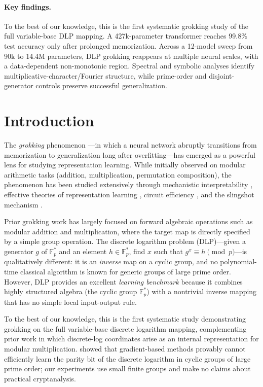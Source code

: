 \documentclass[twoside,11pt]{article}
\newcommand{\Fps}{\mathbb{F}_p^*}
\begin{document}
\paragraph{Key findings.}
To the best of our knowledge, this is the first systematic grokking study of the full variable-base DLP mapping. A 427k-parameter transformer reaches 99.8\% test accuracy only after prolonged memorization. Across a 12-model sweep from 90k to 14.4M parameters, DLP grokking reappears at multiple neural scales, with a data-dependent non-monotonic region. Spectral and symbolic analyses identify multiplicative-character/Fourier structure, while prime-order and disjoint-generator controls preserve successful generalization.

\section{Introduction}
\label{sec:intro}

The \emph{grokking} phenomenon \citep{power2022grokking}---in which a neural network abruptly transitions from memorization to generalization long after overfitting---has emerged as a powerful lens for studying representation learning. While initially observed on modular arithmetic tasks (addition, multiplication, permutation composition), the phenomenon has been studied extensively through mechanistic interpretability \citep{nanda2023progress}, effective theories of representation learning \citep{liu2022understanding}, circuit efficiency \citep{varma2023explaining}, and the slingshot mechanism \citep{thilak2022slingshot}.

Prior grokking work has largely focused on forward algebraic operations such as modular addition and multiplication, where the target map is directly specified by a simple group operation. The discrete logarithm problem (DLP)---given a generator $g$ of $\Fps$ and an element $h \in \Fps$, find $x$ such that $g^x \equiv h \pmod{p}$---is qualitatively different: it is an \emph{inverse} map on a cyclic group, and no polynomial-time classical algorithm is known for generic groups of large prime order. However, DLP provides an excellent \emph{learning benchmark} because it combines highly structured algebra (the cyclic group $\Fps$) with a nontrivial inverse mapping that has no simple local input-output rule.

To the best of our knowledge, this is the first systematic study demonstrating grokking on the full variable-base discrete logarithm mapping, complementing prior work in which discrete-log coordinates arise as an internal representation for modular multiplication. \citet{takhanov2024intractability} showed that gradient-based methods provably cannot efficiently learn the parity bit of the discrete logarithm in cyclic groups of large prime order; our experiments use small finite groups and make no claims about practical cryptanalysis.
\end{document}
